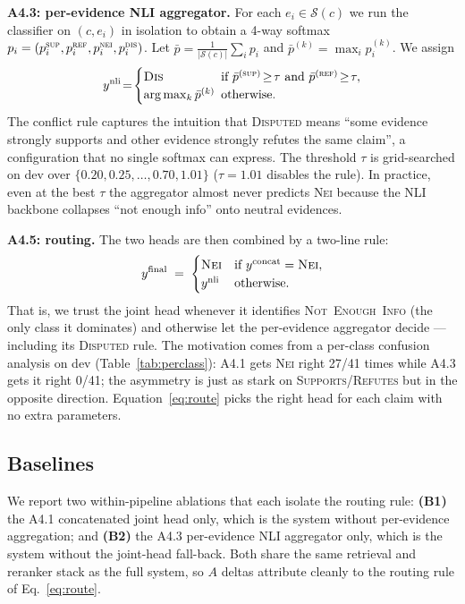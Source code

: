 \documentclass[11pt]{article}
\begin{document}
\textbf{A4.3: per-evidence NLI aggregator.} For each
$e_i\!\in\!\mathcal{S}(c)$ we run the classifier on $(c,e_i)$ in
isolation to obtain a 4-way softmax
$p_i=(p_i^{\textsc{sup}}, p_i^{\textsc{ref}}, p_i^{\textsc{nei}}, p_i^{\textsc{dis}})$.
Let $\bar p = \tfrac{1}{|\mathcal{S}(c)|}\sum_i p_i$ and
$\bar p^{(k)} = \max_i p_i^{(k)}$. We assign
\begin{equation}
y^{\text{nli}} \!=\!
\begin{cases}
\textsc{Dis} & \!\!\!\text{if } \bar p^{(\textsc{sup})}\!\geq\!\tau
              \text{ and } \bar p^{(\textsc{ref})}\!\geq\!\tau,\\
\arg\max_k \bar p^{(k)} & \!\!\!\text{otherwise.}
\end{cases}
\label{eq:agg}
\end{equation}
The conflict rule captures the intuition that
\textsc{Disputed} means ``some evidence strongly supports and other
evidence strongly refutes the same claim'', a configuration that no
single softmax can express. The threshold $\tau$ is grid-searched on
dev over $\{0.20, 0.25, \ldots, 0.70, 1.01\}$ ($\tau=1.01$ disables
the rule). In practice, even at the best $\tau$ the aggregator
almost never predicts \textsc{Nei} because the NLI backbone
collapses ``not enough info'' onto neutral evidences.

\textbf{A4.5: routing.} The two heads are then combined by a
two-line rule:
\begin{equation}
y^{\text{final}}\;=\;
\begin{cases}
\textsc{Nei} & \text{if } y^{\text{concat}}=\textsc{Nei},\\
y^{\text{nli}} & \text{otherwise.}
\end{cases}
\label{eq:route}
\end{equation}
That is, we trust the joint head whenever it identifies
\textsc{Not~Enough~Info} (the only class it dominates) and otherwise
let the per-evidence aggregator decide --- including its
\textsc{Disputed} rule. The motivation comes from a per-class
confusion analysis on dev (Table~\ref{tab:perclass}): A4.1 gets
\textsc{Nei} right 27/41 times while A4.3 gets it right 0/41; the
asymmetry is just as stark on \textsc{Supports}/\textsc{Refutes} but
in the opposite direction. Equation~\ref{eq:route} picks the right
head for each claim with no extra parameters.

\subsection{Baselines}
\label{sec:baselines}
We report two within-pipeline ablations that each isolate the
routing rule: \textbf{(B1)} the A4.1 concatenated joint head only,
which is the system without per-evidence aggregation; and
\textbf{(B2)} the A4.3 per-evidence NLI aggregator only, which is
the system without the joint-head fall-back. Both share the same
retrieval and reranker stack as the full system, so $A$ deltas
attribute cleanly to the routing rule of Eq.~\ref{eq:route}.
\end{document}
